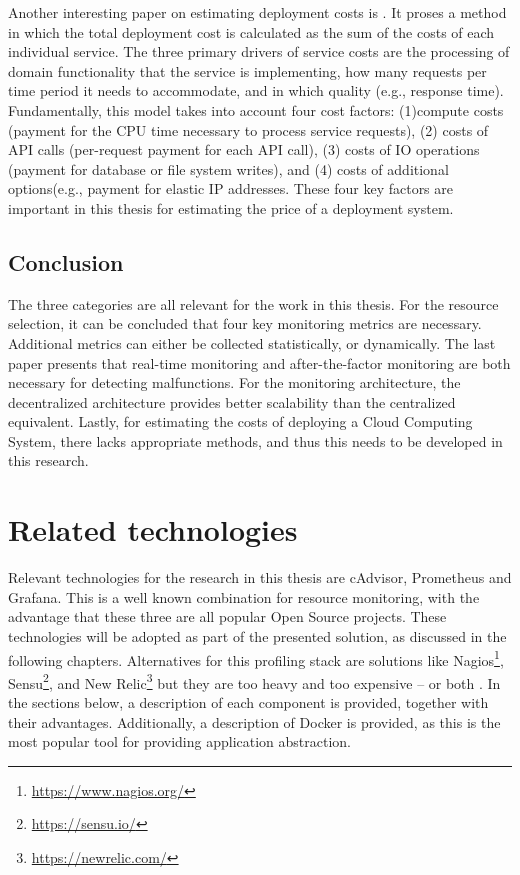 \noindent
Another interesting paper on estimating deployment costs is \cite{leitner2016modelling}. It proses a method in which the total deployment cost is calculated as the sum of the costs of each individual service. The three primary drivers of service costs are the processing of domain functionality that the service is implementing, how many requests per time period it needs to accommodate, and in which quality (e.g., response time). Fundamentally, this model takes into account four cost factors: (1)compute costs (payment for the CPU time necessary to process service requests), (2) costs of API calls (per-request payment for each API call),  (3) costs of IO operations (payment for database or file system writes), and (4) costs of
additional options(e.g., payment for elastic IP addresses. These four key factors are important in this thesis for estimating the price of a deployment system.

\subsection{Conclusion} \label{sec:related_literature_conclusion}
The three categories are all relevant for the work in this thesis. For the resource selection, it can be concluded that four key monitoring metrics are necessary. Additional metrics can either be collected statistically, or dynamically. The last paper presents that real-time monitoring and after-the-factor monitoring are both necessary for detecting malfunctions. For the monitoring architecture, the decentralized architecture provides better scalability than the centralized equivalent. Lastly, for estimating the costs of deploying a Cloud Computing System, there lacks appropriate methods, and thus this needs to be developed in this research. 



\section{Related technologies} \label{sec:related_technologies}
Relevant technologies for the research in this thesis are cAdvisor, Prometheus and Grafana. This is a well known combination for resource monitoring, with the advantage that these three are all popular Open Source projects. These technologies will be adopted as part of the presented solution, as discussed in the following chapters. Alternatives for this profiling stack are solutions like Nagios\footnote{\url{https://www.nagios.org/}}, Sensu\footnote{\url{https://sensu.io/}}, and New Relic\footnote{\url{https://newrelic.com/}} but they are too heavy and too expensive – or both \cite{aceto2013cloud}. In the sections below, a description of each component is provided, together with their advantages. Additionally, a description of Docker is provided, as this is the most popular tool for providing application abstraction.

